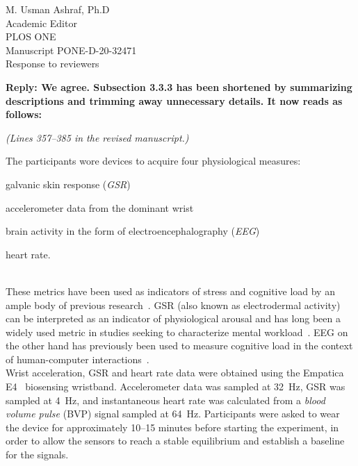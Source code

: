 \documentclass[10pt, letterpaper]{letter}
\newenvironment{QandA}
{\begin{enumerate}[
    label={\bfseries Comment \arabic*:}, 
    wide,
    ref={Comment \arabic*}]}
{\end{enumerate}}
\newenvironment{revised}[2]
{%
\begin{displayquote}
    \medskip
    \begin{flushright}
        \itshape{(Lines \numrange{#1}{#2} in the revised manuscript.)}\normalfont%
    \end{flushright}
    \medskip

}
{\end{displayquote}}
\newenvironment{answered}
{\medskip\par\bfseries Reply: \normalfont}
{\par\noindent\makebox[\linewidth]{\rule{\textwidth}{0.4pt}}\bigskip}
\begin{document}
\begin{letter}{
    M. Usman Ashraf, Ph.D\\
    Academic Editor\\
    PLOS ONE\\
    \medskip
    Manuscript PONE-D-20-32471\\
    Response to reviewers\\
}
\begin{QandA}
    \begin{answered}
        We agree.
        Subsection 3.3.3 has been shortened by summarizing descriptions and trimming away unnecessary details.
        It now reads as follows:

        \begin{revised}{357}{385}
            The participants wore devices to acquire four physiological measures:
            \begin{enumerate*}[itemjoin={{, }},
                            itemjoin*={{, and }},
                            label={{(\arabic*)}}]
            \item galvanic skin response (\emph{GSR})
            \item accelerometer data from the dominant wrist
            \item brain activity in the form of electroencephalography (\emph{EEG})
            \item heart rate.
            \end{enumerate*}\\

            These metrics have been used as indicators of stress and cognitive load by an ample body of previous research~\autocite{khawadi2015:usinggsrtrust,kuikkaniemi2010:biofeedback,solovey2014:classifyingdriverworkload}.
            GSR (also known as electrodermal activity) can be interpreted as an indicator of physiological arousal and has long been a widely used metric in studies seeking to characterize mental workload~\autocite{peterson1907psycho,Healey2005,Son2010,khawadi2015:usinggsrtrust,kuikkaniemi2010:biofeedback,solovey2014:classifyingdriverworkload,}.
            EEG on the other hand has previously been used to measure cognitive load in the context of human-computer interactions~\autocite{Antonenko2010,Grimes2008,kumar2016measurement}.\\

            Wrist acceleration, GSR and heart rate data were obtained using the Empatica E4~\autocite{empatica:e4} biosensing wristband.
            Accelerometer data was sampled at \SI{32}{\hertz},
            GSR was sampled at \SI{4}{\hertz}, and instantaneous heart rate was calculated from a \emph{blood volume pulse} (BVP) signal sampled at \SI{64}{\hertz}.
            Participants were asked to wear the device for approximately 10--15 minutes before starting the experiment, in order to allow the sensors to reach a stable equilibrium and establish a baseline for the signals.\\


\end{revised}
\end{answered}
\end{QandA}
\end{letter}
\end{document}
